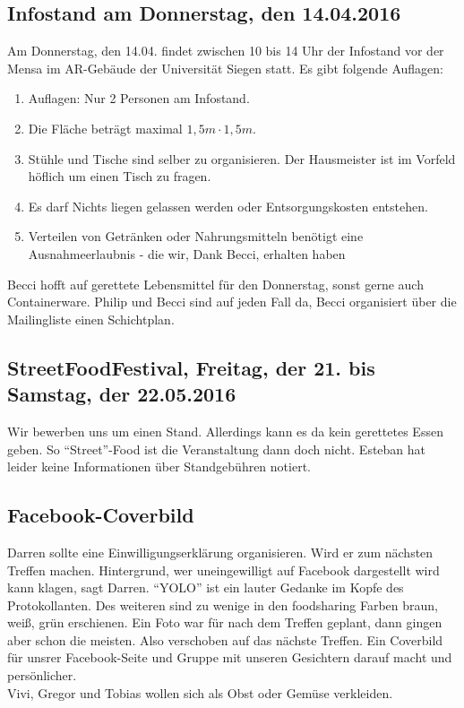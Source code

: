 \documentclass{scrreprt}
\begin{document}
\subsection{Infostand am Donnerstag, den 14.04.2016}
{Am Donnerstag, den 14.04. findet zwischen 10 bis 14 Uhr der Infostand vor der Mensa im AR-Gebäude der Universität Siegen statt. Es gibt folgende Auflagen: 

\begin{enumerate}
\item Auflagen: Nur 2 Personen am Infostand. 
\item Die Fläche beträgt maximal $ 1,5m \cdot 1,5m$. 
\item Stühle und Tische sind selber zu organisieren. Der Hausmeister ist im Vorfeld höflich um einen Tisch zu fragen.
\item Es darf Nichts liegen gelassen werden oder Entsorgungskosten entstehen. 
\item Verteilen von Getränken oder Nahrungsmitteln benötigt eine Ausnahmeerlaubnis - die wir, Dank Becci, erhalten haben
\end{enumerate} 
Becci hofft auf gerettete Lebensmittel für den Donnerstag, sonst gerne auch Containerware. Philip und Becci sind auf jeden Fall da, Becci organisiert über die Mailingliste einen Schichtplan. 

\subsection{StreetFoodFestival, Freitag, der 21. bis Samstag, der 22.05.2016 }
Wir bewerben uns um einen Stand. Allerdings kann es da kein gerettetes Essen geben. So \enquote{Street}-Food ist die Veranstaltung dann doch nicht. Esteban hat leider keine Informationen über Standgebühren notiert.

\subsection{Facebook-Coverbild}
Darren sollte eine Einwilligungserklärung organisieren. Wird er zum nächsten Treffen machen. Hintergrund, wer uneingewilligt auf Facebook dargestellt wird kann klagen, sagt Darren. \enquote{YOLO} ist ein lauter Gedanke im Kopfe des Protokollanten. Des weiteren sind zu wenige in den foodsharing Farben braun, weiß, grün erschienen. Ein Foto war für nach dem Treffen geplant, dann gingen aber schon die meisten. Also verschoben auf das nächste Treffen. Ein Coverbild für unsrer Facebook-Seite und Gruppe mit unseren Gesichtern darauf macht und persönlicher.\\
Vivi, Gregor und Tobias wollen sich als Obst oder Gemüse verkleiden. 

}
\end{document}
